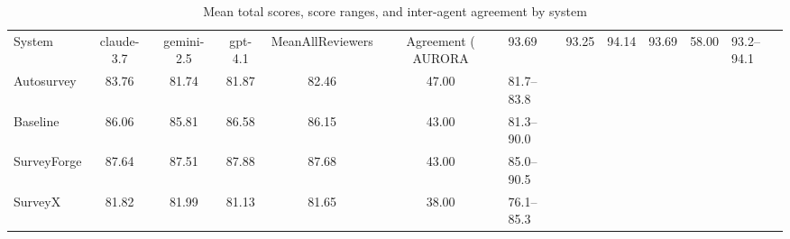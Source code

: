 \begin{table}
\caption{Mean total scores, score ranges, and inter-agent agreement by system}
\label{tab:total_summary}
\begin{tabular}{lcccccp{2cm}}
\toprule
System & claude-3.7 & gemini-2.5 & gpt-4.1 & MeanAllReviewers & Agreement (%
\midrule
AURORA & 93.69 & 93.25 & 94.14 & 93.69 & 58.00 & 93.2–94.1 \\
Autosurvey & 83.76 & 81.74 & 81.87 & 82.46 & 47.00 & 81.7–83.8 \\
Baseline & 86.06 & 85.81 & 86.58 & 86.15 & 43.00 & 81.3–90.0 \\
SurveyForge & 87.64 & 87.51 & 87.88 & 87.68 & 43.00 & 85.0–90.5 \\
SurveyX & 81.82 & 81.99 & 81.13 & 81.65 & 38.00 & 76.1–85.3 \\
\bottomrule
\end{tabular}
\end{table}
